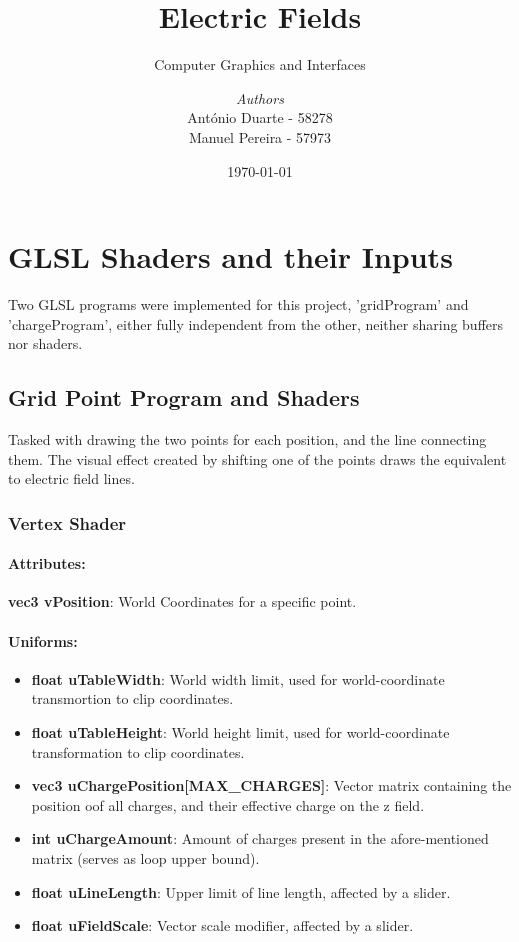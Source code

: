 \documentclass[10pt]{report}
\institute{Universidade Nova de Lisboa}
\title{Electric Fields}
\subtitle{Computer Graphics and Interfaces}
\author{\textit{Authors}\\António Duarte - 58278\\Manuel Pereira - 57973}
\date{\today}
\begin{document}
\maketitle
\romantableofcontents

\chapter{GLSL Shaders and their Inputs}

Two GLSL programs were implemented for this project, 'gridProgram' and 'chargeProgram', either fully independent from the other, neither sharing buffers nor shaders.
	
\section{Grid Point Program and Shaders}

Tasked with drawing the two points for each position, and the line connecting them. The visual effect created by shifting one of the points draws the equivalent to electric field lines.

\subsection{Vertex Shader}

\subsubsection{Attributes:}

\textbf{vec3 vPosition}: World Coordinates for a specific point.

\subsubsection{Uniforms:}

\begin{itemize}
    \item \textbf{float uTableWidth}: World width limit, used for world-coordinate transmortion to clip coordinates.
    \item \textbf{float uTableHeight}: World height limit, used for world-coordinate transformation to clip coordinates.
    \item \textbf{vec3 uChargePosition[MAX\_CHARGES]}: Vector matrix containing the position oof all charges, and their effective charge on the z field.
    \item \textbf{int uChargeAmount}: Amount of charges present in the afore-mentioned matrix (serves as loop upper bound).
    \item \textbf{float uLineLength}: Upper limit of line length, affected by a slider.
    \item \textbf{float uFieldScale}: Vector scale modifier, affected by a slider.
\end{itemize}
\end{document}
